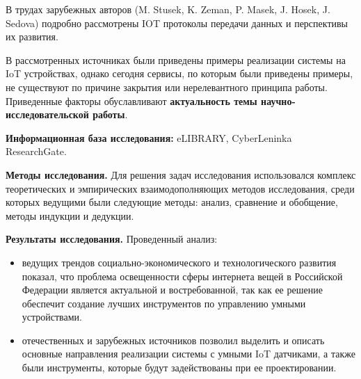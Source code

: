 В трудах зарубежных авторов (M. Stusek, K. Zeman, P. Masek, J. Hosek, J. Sedova) подробно рассмотрены IOT протоколы передачи данных и перспективы их развития.

В рассмотренных источниках были приведены примеры реализации системы на IoT устройствах, однако сегодня сервисы, по которым были приведены примеры, не существуют по причине закрытия или нерелевантного принципа работы. Приведенные факторы обуславливают \textbf{актуальность темы научно-исследовательской работы}.

\textbf{Информационная база исследования:} eLIBRARY, CyberLeninka ResearchGate.

\textbf{Методы исследования.} Для решения задач исследования использовался комплекс теоретических и эмпирических взаимодополняющих методов исследования, среди которых ведущими были следующие методы: анализ, сравнение и обобщение, методы индукции и дедукции.

\textbf{Результаты исследования.} Проведенный анализ:

\begin{itemize}
  \item ведущих трендов социально-экономического и технологического развития показал, что проблема освещенности сферы интернета вещей в Российской Федерации является актуальной и востребованной, так как ее решение обеспечит создание лучших инструментов по управлению умными устройствами.
  \item отечественных и зарубежных источников позволил выделить и описать основные направления реализации системы с умными IoT датчиками, а также были инструменты, которые будут задействованы при ее проектировании.
\end{itemize}

\clearpage

